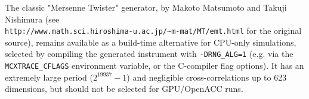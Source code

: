 The classic "Mersenne Twister" generator, by Makoto Matsumoto and
Takuji Nishimura\cite{matsumoto1998mersenne} (see \\
\verb+http://www.math.sci.hiroshima-u.ac.jp/~m-mat/MT/emt.html+ for the
original source), remains available as a build-time alternative for
CPU-only simulations, selected by compiling the generated instrument
with \verb+-DRNG_ALG=1+ (e.g. via the \verb+MCXTRACE_CFLAGS+
environment variable, or the C-compiler flag options). It has an
extremely large period ($2^{19937}-1$) and negligible
cross-correlations up to 623 dimensions, but should not be selected for
GPU/OpenACC runs.
